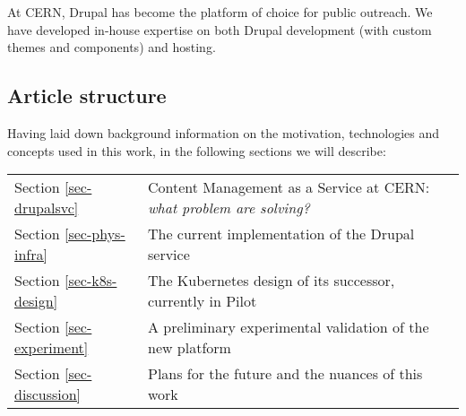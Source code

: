 At CERN, Drupal has become the platform of choice for public outreach.
We have developed in-house expertise on both Drupal development (with custom themes and components) and hosting.

\subsection{Article structure}

Having laid down background information on the motivation, technologies and concepts used in this work, in the following sections we will describe:

\begin{tabular}{l|l}
    Section \ref{sec-drupalsvc} & Content Management as a Service at CERN: \emph{what problem are solving?} \\
    Section \ref{sec-phys-infra} & The current implementation of the Drupal service \\
    Section \ref{sec-k8s-design} & The Kubernetes design of its successor, currently in Pilot \\
    Section \ref{sec-experiment} & A preliminary experimental validation of the new platform \\
    Section \ref{sec-discussion} & Plans for the future and the nuances of this work \\
\end{tabular}